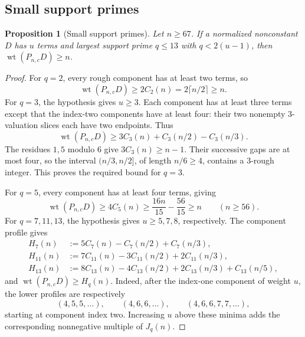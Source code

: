 \documentclass[11pt]{article}
\DeclareMathOperator{\wt}{wt}\DeclareMathOperator{\ord}{ord}
\numberwithin{equation}{section}
\newtheorem{proposition}[theorem]{Proposition}
\theoremstyle{definition}\newtheorem{definition}[theorem]{Definition}
\theoremstyle{remark}\newtheorem{remark}[theorem]{Remark}
\begin{document}
\subsection{Small support primes}
\label{arith:sec:small-prime-profile-replacement}

\begin{proposition}[Small support primes]
\label{arith:prop:small-prime-profile-replacement}
Let $n\ge67$. If a normalized nonconstant $D$ has $u$ terms and largest support prime
$q\le13$ with $q<2(u-1)$, then $\wt(P_{n,c}D)\ge n$.
\end{proposition}

\begin{proof}
For $q=2$, every rough component has at least two terms, so
\[
 \wt(P_{n,c}D)\ge2C_2(n)=2\lceil n/2\rceil\ge n.
\]
For $q=3$, the hypothesis gives $u\ge3$.  Each component
has at least three terms except that the index-two components have
at least four: their two nonempty $3$-valuation slices each have
two endpoints.  Thus
\[
 \wt(P_{n,c}D)\ge3C_3(n)+C_3(n/2)-C_3(n/3).
\]
The residues $1,5$ modulo $6$ give $3C_3(n)\ge n-1$.
Their successive gaps are at most four, so the interval
$(n/3,n/2]$, of length $n/6\ge4$, contains a $3$-rough integer.
This proves the required bound for $q=3$.

For $q=5$, every component has at least four terms, giving
\[
 \wt(P_{n,c}D)\ge4C_5(n)
 \ge\frac{16n}{15}-\frac{56}{15}\ge n
 \qquad(n\ge56).
\]
For $q=7,11,13$, the hypothesis gives $u\ge5,7,8$, respectively.
The component profile gives
\begin{align*}
 H_7(n)&:=5C_7(n)-C_7(n/2)+C_7(n/3),\\
 H_{11}(n)&:=7C_{11}(n)-3C_{11}(n/2)+2C_{11}(n/3),\\
 H_{13}(n)&:=8C_{13}(n)-4C_{13}(n/2)
             +2C_{13}(n/3)+C_{13}(n/5),
\end{align*}
and $\wt(P_{n,c}D)\ge H_q(n)$.  Indeed, after the index-one component
of weight $u$, the lower profiles are respectively
\[
 (4,5,5,\ldots),\qquad (4,6,6,\ldots),\qquad
 (4,6,6,7,7,\ldots),
\]
starting at component index two. Increasing $u$ above these minima
adds the corresponding nonnegative multiple of $J_q(n)$.


\end{proof}
\end{document}

